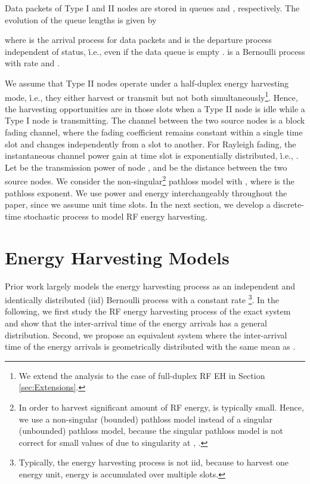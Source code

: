 \documentclass[draftcls,12pt,onecolumn]{IEEEtran}
\begin{document}
Data packets of Type I and II nodes are stored in queues  and , respectively. The evolution of the queue lengths is given by \cite{szpankowski} 

where  is the arrival process for data packets and  is the departure process independent of  status, \.i.e.,  even if the data queue is empty \cite{naware2005stability}.  is a Bernoulli process with rate  and . 

We assume that Type II nodes operate under a half-duplex energy harvesting mode, \.i.e., they either harvest or transmit but not both simultaneously\footnote{We extend the analysis to the case of full-duplex RF EH in Section \ref{sec:Extensions}.}. Hence, the harvesting opportunities are in those slots when a Type II node is idle while a Type I node is transmitting. The channel between the two source nodes is a block fading channel, where the fading coefficient remains constant within a single time slot and changes independently from a slot to another. For Rayleigh fading, the instantaneous channel power gain  at time slot  is exponentially distributed, \.i.e., . Let  be the transmission power of node , and  be the distance between the two source nodes. We consider the non-singular\footnote{In order to harvest significant amount of RF energy,  is typically small. Hence, we use a non-singular (bounded) pathloss model instead of a singular (unbounded) pathloss  model, because the singular pathloss model is not correct for small values of  due to singularity at , \cite{2009unbounded}. } pathloss model with , where  is the pathloss exponent. We use power and energy interchangeably throughout the paper, since we assume unit time slots. In the next section, we develop a discrete-time stochastic process to model RF energy harvesting. 


\section{Energy Harvesting Models} \label{sec:Energy_Harvesting_Model}

Prior work largely models the energy harvesting process as an independent and identically distributed (iid) Bernoulli process with a constant rate \cite{jeon2015stability}\footnote{Typically, the energy harvesting process is not iid, because to harvest one energy unit, energy is accumulated over multiple slots.}. In the following, we first study the RF energy harvesting process of the exact system  and show that the inter-arrival time of the energy arrivals has a general distribution. Second, we propose an equivalent system  where the inter-arrival time of the energy arrivals is geometrically distributed with the same mean as . 
\end{document}
